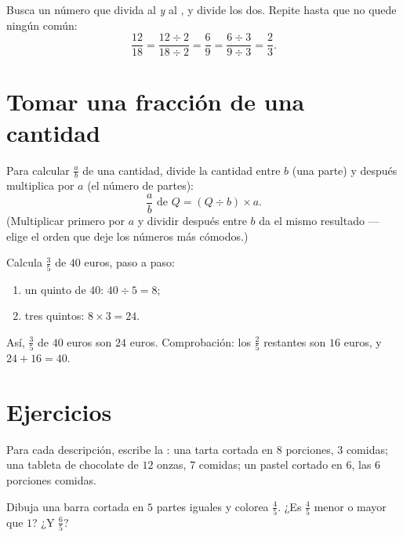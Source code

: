 \begin{method}\label{met:g6:fractions:simplify}
Busca un número que divida al  \emph{y} al ,
y divide los dos. Repite hasta que no quede ningún  común:
\[
\frac{12}{18} = \frac{12 \div 2}{18 \div 2} = \frac{6}{9}
= \frac{6 \div 3}{9 \div 3} = \frac{2}{3}.
\]
\end{method}

\section{Tomar una fracción de una cantidad}

\begin{method}\label{met:g6:fractions:ofquantity}
Para calcular $\frac ab$ de una cantidad, divide la cantidad entre $b$ (una
parte) y después multiplica por $a$ (el número de partes):
\[
\frac ab \text{ de } Q = (Q \div b) \times a .
\]
(Multiplicar primero por $a$ y dividir después entre $b$ da el mismo
resultado --- elige el orden que deje los números más cómodos.)
\end{method}

\begin{example}\label{ex:g6:fractions:ofquantity}
Calcula $\frac35$ de $40$ euros, paso a paso:
\begin{enumerate}
  \item un quinto de $40$: $40 \div 5 = 8$;
  \item tres quintos: $8 \times 3 = 24$.
\end{enumerate}
Así, $\frac35$ de $40$ euros son $24$ euros. Comprobación: los $\frac25$
restantes son $16$ euros, y $24 + 16 = 40$.
\end{example}

\section{Ejercicios}

\begin{exercise}[$\star$]\label{exo:g6:fractions:1}
Para cada descripción, escribe la : una tarta cortada en $8$
porciones, $3$ comidas; una tableta de chocolate de $12$ onzas, $7$ comidas; un pastel
cortado en $6$, las $6$ porciones comidas.
\end{exercise}

\begin{exercise}[$\star$]\label{exo:g6:fractions:2}
Dibuja una barra cortada en $5$ partes iguales y colorea $\frac45$. ¿Es
$\frac45$ menor o mayor que $1$? ¿Y $\frac65$?
\end{exercise}

